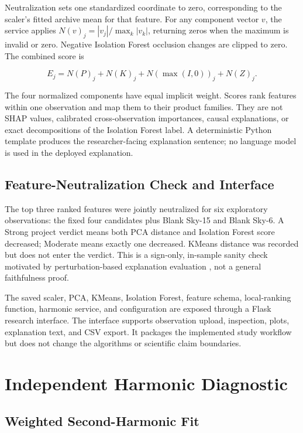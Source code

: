 \documentclass[conference]{IEEEtran}
\begin{document}
Neutralization sets one standardized coordinate to zero, corresponding to the scaler's fitted archive mean for that feature. For any component vector $v$, the service applies $N(v)_j=|v_j|/\max_k|v_k|$, returning zeros when the maximum is invalid or zero. Negative Isolation Forest occlusion changes are clipped to zero. The combined score is


\begin{equation*}
E_j=N(P)_j+N(K)_j+N(\max(I,0))_j+N(Z)_j.
\end{equation*}

The four normalized components have equal implicit weight. Scores rank features within one observation and map them to their product families. They are not SHAP values, calibrated cross-observation importances, causal explanations, or exact decompositions of the Isolation Forest label. A deterministic Python template produces the researcher-facing explanation sentence; no language model is used in the deployed explanation.


\subsection{Feature-Neutralization Check and Interface}

The top three ranked features were jointly neutralized for six exploratory observations: the fixed four candidates plus Blank Sky-15 and Blank Sky-6. A Strong project verdict means both PCA distance and Isolation Forest score decreased; Moderate means exactly one decreased. KMeans distance was recorded but does not enter the verdict. This is a sign-only, in-sample sanity check motivated by perturbation-based explanation evaluation \cite{yeh2019infidelity}, not a general faithfulness proof.


The saved scaler, PCA, KMeans, Isolation Forest, feature schema, local-ranking function, harmonic service, and configuration are exposed through a Flask research interface. The interface supports observation upload, inspection, plots, explanation text, and CSV export. It packages the implemented study workflow but does not change the algorithms or scientific claim boundaries.


\section{Independent Harmonic Diagnostic}

\subsection{Weighted Second-Harmonic Fit}
\end{document}
